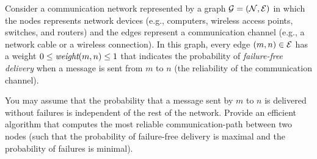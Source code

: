 \begin{problem}
Consider a communication network represented by a graph $\mathcal{G} = (\mathcal{N}, \mathcal{E})$ in which the nodes represents network devices (e.g., computers, wireless access points, switches, and routers) and the edges represent a communication channel (e.g., a network cable or a wireless connection). In this graph, every edge $(m, n) \in \mathcal{E}$ has a weight $0\leq\mathord{\textit{weight}}{(m, n)}\leq 1$ that indicates the probability of \emph{failure-free delivery} when a message is sent from $m$ to $n$ (the reliability of the communication channel).

You may assume that the probability that a message sent by $m$ to $n$ is delivered without failures is independent  of the rest of the network. Provide an efficient algorithm that computes the most reliable communication-path between two nodes (such that the probability of failure-free delivery is maximal and the probability of failures is minimal).
\end{problem}

\SUBMITMSG{}
\DEFAULTGRADING{}

